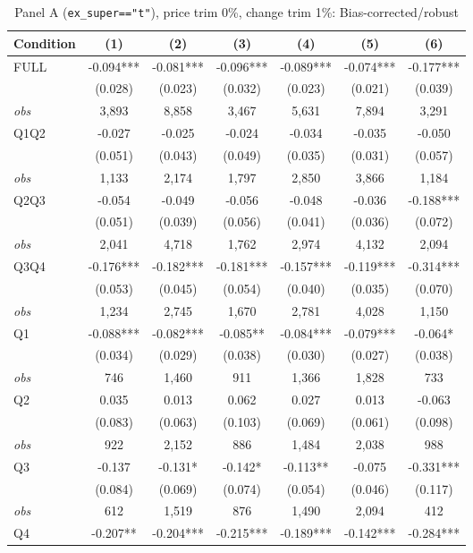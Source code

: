 \begin{table}[!htbp]
\centering
\caption{Panel A (\texttt{ex\_super=="t"}), price trim 0\%, change trim 1\%: Bias-corrected/robust}
\label{tab:a:trim01:robust}
\small
\begin{tabular}{lcccccc}
\toprule
Condition & (1) & (2) & (3) & (4) & (5) & (6) \\
\midrule
FULL & -0.094*** & -0.081*** & -0.096*** & -0.089*** & -0.074*** & -0.177*** \\
 & (0.028) & (0.023) & (0.032) & (0.023) & (0.021) & (0.039) \\
\textit{obs} & 3,893 & 8,858 & 3,467 & 5,631 & 7,894 & 3,291 \\
Q1Q2 & -0.027 & -0.025 & -0.024 & -0.034 & -0.035 & -0.050 \\
 & (0.051) & (0.043) & (0.049) & (0.035) & (0.031) & (0.057) \\
\textit{obs} & 1,133 & 2,174 & 1,797 & 2,850 & 3,866 & 1,184 \\
Q2Q3 & -0.054 & -0.049 & -0.056 & -0.048 & -0.036 & -0.188*** \\
 & (0.051) & (0.039) & (0.056) & (0.041) & (0.036) & (0.072) \\
\textit{obs} & 2,041 & 4,718 & 1,762 & 2,974 & 4,132 & 2,094 \\
Q3Q4 & -0.176*** & -0.182*** & -0.181*** & -0.157*** & -0.119*** & -0.314*** \\
 & (0.053) & (0.045) & (0.054) & (0.040) & (0.035) & (0.070) \\
\textit{obs} & 1,234 & 2,745 & 1,670 & 2,781 & 4,028 & 1,150 \\
Q1 & -0.088*** & -0.082*** & -0.085** & -0.084*** & -0.079*** & -0.064* \\
 & (0.034) & (0.029) & (0.038) & (0.030) & (0.027) & (0.038) \\
\textit{obs} &   746 & 1,460 &   911 & 1,366 & 1,828 &   733 \\
Q2 & 0.035 & 0.013 & 0.062 & 0.027 & 0.013 & -0.063 \\
 & (0.083) & (0.063) & (0.103) & (0.069) & (0.061) & (0.098) \\
\textit{obs} &   922 & 2,152 &   886 & 1,484 & 2,038 &   988 \\
Q3 & -0.137 & -0.131* & -0.142* & -0.113** & -0.075 & -0.331*** \\
 & (0.084) & (0.069) & (0.074) & (0.054) & (0.046) & (0.117) \\
\textit{obs} &   612 & 1,519 &   876 & 1,490 & 2,094 &   412 \\
Q4 & -0.207** & -0.204*** & -0.215*** & -0.189*** & -0.142*** & -0.284*** \\

\end{tabular}
\end{table}
